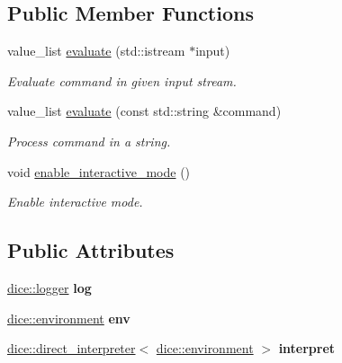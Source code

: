 \subsection*{Public Member Functions}
\begin{DoxyCompactItemize}
\item 
value\+\_\+list \mbox{\hyperlink{structdice_1_1calculator_a63547bad8045470c9849124502036052}{evaluate}} (std\+::istream $\ast$input)
\begin{DoxyCompactList}\small\item\em Evaluate command in given input stream. \end{DoxyCompactList}\item 
value\+\_\+list \mbox{\hyperlink{structdice_1_1calculator_ad1b34884dbf00d5e1e140195e9a50ecc}{evaluate}} (const std\+::string \&command)
\begin{DoxyCompactList}\small\item\em Process command in a string. \end{DoxyCompactList}\item 
void \mbox{\hyperlink{structdice_1_1calculator_a6fe7689c86d8df71f7f312dbd7defdcf}{enable\+\_\+interactive\+\_\+mode}} ()
\begin{DoxyCompactList}\small\item\em Enable interactive mode. \end{DoxyCompactList}\end{DoxyCompactItemize}
\subsection*{Public Attributes}
\begin{DoxyCompactItemize}
\item 
\mbox{\label{structdice_1_1calculator_ab9cb5e793d3db99f481b6335c155f193}} 
\mbox{\hyperlink{classdice_1_1logger}{dice\+::logger}} {\bfseries log}
\item 
\mbox{\label{structdice_1_1calculator_a88bc893a03a784dd6a5bfeb4583ce60f}} 
\mbox{\hyperlink{classdice_1_1environment}{dice\+::environment}} {\bfseries env}
\item 
\mbox{\label{structdice_1_1calculator_a6e029fd9e45e36f4f4b92c7a9df8c3da}} 
\mbox{\hyperlink{classdice_1_1direct__interpreter}{dice\+::direct\+\_\+interpreter}}$<$ \mbox{\hyperlink{classdice_1_1environment}{dice\+::environment}} $>$ {\bfseries interpret}
\end{DoxyCompactItemize}


